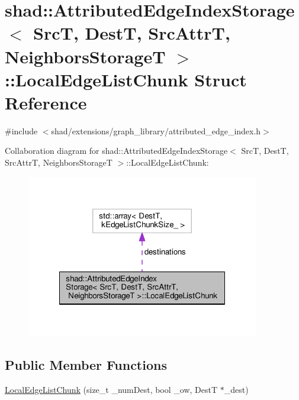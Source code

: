 \hypertarget{structshad_1_1AttributedEdgeIndexStorage_1_1LocalEdgeListChunk}{\section{shad\-:\-:Attributed\-Edge\-Index\-Storage$<$ Src\-T, Dest\-T, Src\-Attr\-T, Neighbors\-Storage\-T $>$\-:\-:Local\-Edge\-List\-Chunk Struct Reference}
\label{structshad_1_1AttributedEdgeIndexStorage_1_1LocalEdgeListChunk}
}


{\ttfamily \#include $<$shad/extensions/graph\-\_\-library/attributed\-\_\-edge\-\_\-index.\-h$>$}



Collaboration diagram for shad\-:\-:Attributed\-Edge\-Index\-Storage$<$ Src\-T, Dest\-T, Src\-Attr\-T, Neighbors\-Storage\-T $>$\-:\-:Local\-Edge\-List\-Chunk\-:
\nopagebreak
\begin{figure}[H]
\begin{center}
\leavevmode
\includegraphics[width=288pt]{structshad_1_1AttributedEdgeIndexStorage_1_1LocalEdgeListChunk__coll__graph}
\end{center}
\end{figure}
\subsection*{Public Member Functions}
\begin{DoxyCompactItemize}
\item 
\hyperlink{structshad_1_1AttributedEdgeIndexStorage_1_1LocalEdgeListChunk_ac1f2e87de40eef9204e75d92ce3e48c6}{Local\-Edge\-List\-Chunk} (size\-\_\-t \-\_\-num\-Dest, bool \-\_\-ow, Dest\-T $\ast$\-\_\-dest)
\end{DoxyCompactItemize}
